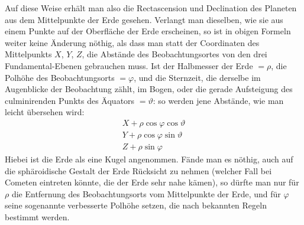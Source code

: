 Auf diese Weise erhält man also die Rectascension und Declination des
Planeten aus dem Mittelpunkte der Erde gesehen. Verlangt man dieselben, wie
sie aus einem Punkte auf der Oberfläche der Erde erscheinen, so ist in obigen
Formeln weiter keine Änderung nöthig, als dass man statt der Coordinaten des
Mittelpunkts $X$, $Y$, $Z$, die Abstände des Beobachtungsortes von den drei Fundamental-Ebenen
gebrauchen muss. Ist der Halbmesser der Erde $=\rho$, die
Polhöhe des Beobachtungsorts $=\varphi$, und die Sternzeit, die derselbe im Augenblicke
der Beobachtung zählt, im Bogen, oder die gerade Aufsteigung des culminirenden
Punkts des Äquators $=\vartheta$: so werden jene Abstände, wie man leicht
übersehen wird:
\[
\begin{gathered}
X+\rho\cos\varphi\cos\vartheta\\
Y+\rho\cos\varphi\sin\vartheta\\
Z+\rho\sin\varphi
\end{gathered}
\]
Hiebei ist die Erde als eine Kugel angenommen. Fände man es nöthig, auch
auf die sphäroidische Gestalt der Erde Rücksicht zu nehmen (welcher Fall bei
Cometen eintreten könnte, die der Erde sehr nahe kämen), so dürfte man nur
für $\rho$ die Entfernung des Beobachtungsorts vom Mittelpunkte der Erde, und für
$\varphi$ seine sogenannte verbesserte Polhöhe setzen, die nach bekannten Regeln bestimmt
werden.

